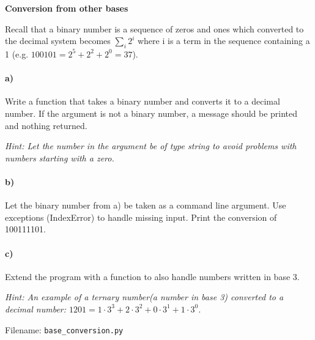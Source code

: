 \newpage
\begin{Problem}{\textbf{Conversion from other bases}} \label{prob47}

\noindent Recall that a binary number is a sequence of zeros and ones which
converted to the decimal system becomes $\sum_i 2^i$ where i is a term in the sequence
containing a 1 (e.g. $100101 = 2^5 + 2^2 + 2^0 = 37$).

\paragraph{a)}
Write a function that takes a binary number and converts it to a decimal number.
If the argument is not a binary number, a message should be printed and nothing
returned.

\emph{Hint: Let the number in the argument be of type string to avoid problems with
numbers starting with a zero.}
\paragraph{b)}
Let the binary number from a) be taken as a command line argument.
Use exceptions (IndexError) to handle missing input. Print the conversion of
100111101.
\paragraph{c)}
Extend the program with a function to also handle numbers written in base 3.

\emph{Hint: An example of a ternary number(a number in base 3) converted to a decimal number:
 $1201 = 1\cdot 3^3 + 2\cdot 3^2 + 0\cdot 3^1 + 1\cdot 3^0$.}

Filename: \texttt{base\_conversion.py}
\end{Problem}



